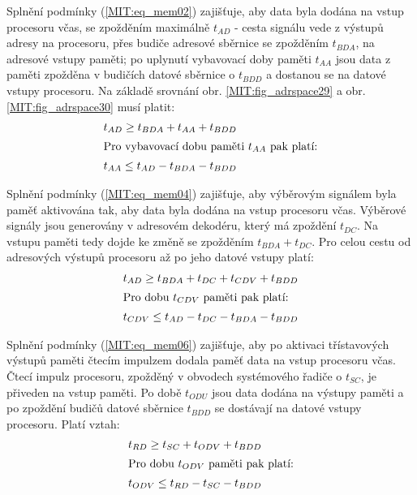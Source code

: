         Splnění podmínky (\ref{MIT:eq_mem02}) zajišťuje, aby data byla dodána na vstup procesoru 
        včas, se zpožděním maximálně \(t_{AD}\) - cesta signálu vede z výstupů adresy na procesoru, 
        přes budiče adresové sběrnice se zpožděním \(t_{BDA}\), na adresové vstupy paměti; po 
        uplynutí vybavovací doby paměti \(t_{AA}\) jsou data z paměti zpožděna v budičích datové 
        sběrnice o \(t_{BDD}\) a dostanou se na datové vstupy procesoru. Na základě srovnání obr. 
        \ref{MIT:fig_adrspace29} a obr. \ref{MIT:fig_adrspace30} musí platit:        
        \begin{align}
          t_{AD} \geq t_{BDA} + t_{AA} + t_{BDD} \label{MIT:eq_mem01}            \\
          \shortintertext{Pro vybavovací dobu paměti \(t_{AA}\) pak platí:}
          t_{AA} \leq t_{AD} - t_{BDA} - t_{BDD} \label{MIT:eq_mem02}
        \end{align}
        
        Splnění podmínky (\ref{MIT:eq_mem04}) zajišťuje, aby výběrovým signálem 
         byla paměť aktivována tak, aby data byla dodána na vstup 
        procesoru včas. Výběrové signály jsou generovány v adresovém dekodéru, který má zpoždění 
        \(t_{DC}\). Na vstupu  paměti tedy dojde ke změně se zpožděním 
        \(t_{BDA} + t_{DC}\). Pro celou cestu od adresových výstupů procesoru až po jeho datové 
        vstupy platí:
        \begin{align}
          t_{AD} \geq t_{BDA} + t_{DC} + t_{CDV} + t_{BDD} \label{MIT:eq_mem03}    \\
          \shortintertext{Pro dobu \(t_{CDV}\) paměti pak platí:}
          t_{CDV} \leq t_{AD} - t_{DC} - t_{BDA} - t_{BDD} \label{MIT:eq_mem04}
        \end{align}
        
        Splnění podmínky (\ref{MIT:eq_mem06}) zajišťuje, aby po aktivaci třístavových výstupů 
        paměti čtecím impulzem  dodala paměť data na vstup procesoru 
        včas. Čtecí impulz procesoru, zpožděný v obvodech systémového řadiče o \(t_{SC}\), je 
        přiveden na vstup  paměti. Po době \(t_{ODU}\) jsou data dodána 
        na výstupy paměti a po zpoždění budičů datové sběrnice \(t_{BDD}\) se dostávají na datové 
        vstupy procesoru. Platí vztah:
        \begin{align}
          t_{RD} \geq t_{SC} + t_{ODV} + t_{BDD} \label{MIT:eq_mem05}  \\
          \shortintertext{Pro dobu \(t_{ODV}\) paměti pak platí:}
          t_{ODV} \leq t_{RD} - t_{SC} - t_{BDD}  \label{MIT:eq_mem06}
        \end{align}

